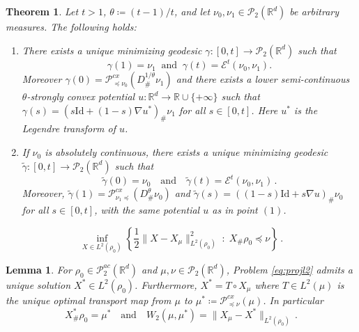 \documentclass[10pt,a4paper]{amsart}
\newtheorem{theorem}{Theorem}
\newtheorem{lemma}{Lemma}
\def\mc#1{\mathcal{#1}}
\begin{document}
\begin{theorem}\label{th:projextra} Let $t>1$, 
$\theta \coloneqq (t-1)/t$, and let $\nu_0,\nu_1\in \mc{P}_2(\mathbb{R}^d)$  be arbitrary measures. The following holds:
\begin{enumerate}
    \item There exists a unique minimizing geodesic $\gamma:[0,t] \rightarrow \mc{P}_2(\mathbb{R}^d)$ such that \[
    \gamma(1) = \nu_1~\text{ and }~\gamma(t) = \mathscr{E}^t(\nu_0,\nu_1) .\]
    Moreover $\gamma(0) = \mathscr{P}^{cx}_{\preceq \nu_0}(D^{1/\theta}_\# \nu_1)$  and there exists a lower semi-continuous $\theta$-strongly convex potential $u:\mathbb{R}^d \rightarrow \mathbb{R} \cup \{+\infty\}$ such that $\gamma(s) = (s\mathrm{Id}+ (1-s)\nabla u^*)_\#\nu_1$ for all $s\in[0,t]$. 
    { Here $u^*$ is the Legendre transform of $u$.}

  

\item If  $\nu_0$ is absolutely continuous, there exists a unique minimizing geodesic $\tilde{\gamma}:[0,t]\rightarrow \mc{P}_2(\mathbb{R}^d)$ such that
\[
\tilde{\gamma}(0)=\nu_0 \quad \text{and}\quad \tilde{\gamma}(t) = \mathscr{E}^t(\nu_0,\nu_1)\,.
\]
Moreover,  $\tilde{\gamma}(1) = \mathscr{P}^{cx}_{\nu_1 \preceq}(D^\theta_\#\nu_0)$ and $\tilde{\gamma}(s) = ((1-s)\mathrm{Id}+ s\nabla u)_\#\nu_0$ for all $s\in[0,t]$, with the same potential $u$ as in point $(1)$.    
\end{enumerate}
\end{theorem}

\begin{equation}\label{eq:projl2}
\inf_{X\in L^2(\rho_0)} \left\{ \frac{1}{2}\|X - X_\mu \|^2_{ L^2(\rho_0)} \; :\; X_\# \rho_0  \preceq \nu \right\}\,.
\end{equation}

\begin{lemma}\label{lem:lift} 
{For  $\rho_0 \in \mc{P}_2^{ac}(\mathbb{R}^d)$ and $\mu, \nu  \in \mc{P}_2(\mathbb{R}^d)$,}
Problem \eqref{eq:projl2} admits a unique solution $X^*\in L^2(\rho_0)$. Furthermore, $X^* = T\circ X_\mu$ where $T\in L^2(\mu)$ is the unique optimal transport map from $\mu$ to $\mu^* \coloneqq \mathscr{P}_{\preceq \nu}^{cx}(\mu)$. In particular
\begin{equation}\label{eq:equality}
X^*_\# \rho_0 =  \mu^* \quad \text{and} \quad W_2(\mu,\mu^*) = \|X_\mu - X^*\|_{L^2(\rho_0)}\,. 
\end{equation}
\end{lemma}
\end{document}

